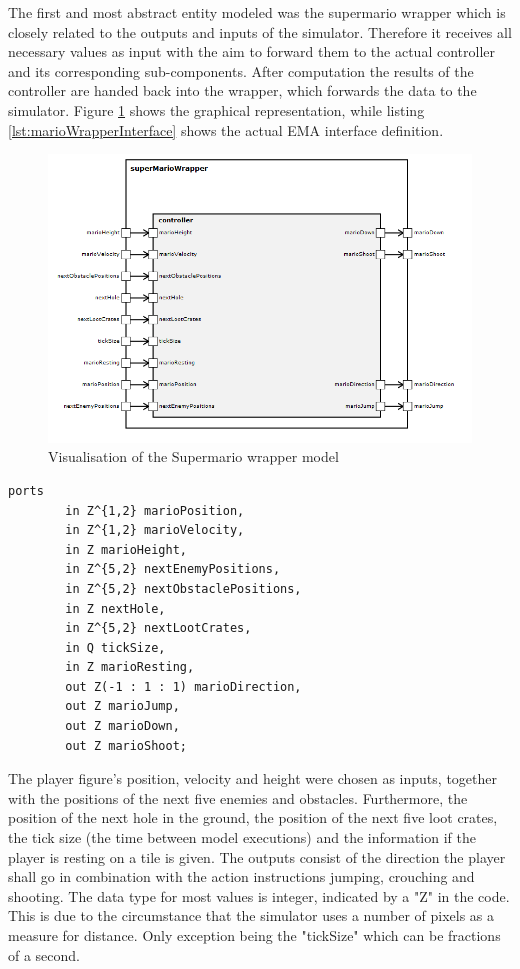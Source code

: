 The first and most abstract entity modeled was the supermario wrapper which is closely related to the outputs and inputs of the simulator. Therefore it receives all necessary values as input with the aim to forward them to the actual controller and its corresponding sub-components. After computation the results of the controller are handed back into the wrapper, which forwards the data to the simulator. Figure \ref{fig:marioWrapper} shows the graphical representation, while listing \ref{lst:marioWrapperInterface} shows the actual EMA interface definition.
\begin{figure}
	\centering
	\includegraphics[scale=0.5]{pictures/haller_supermariowrapper.PNG}
	\caption{Visualisation of the Supermario wrapper model}
	\label{fig:marioWrapper}
\end{figure}

\begin{lstlisting}[label=lst:marioWrapperInterface, caption=Interface of the Supermario Wrapper, morekeywords={ports, port, connect, in, out, instance, ->},
frame=single]
    ports   
        in Z^{1,2} marioPosition,
        in Z^{1,2} marioVelocity,
        in Z marioHeight,
        in Z^{5,2} nextEnemyPositions,
        in Z^{5,2} nextObstaclePositions,
        in Z nextHole,
        in Z^{5,2} nextLootCrates,
        in Q tickSize,
        in Z marioResting,
        out Z(-1 : 1 : 1) marioDirection,
        out Z marioJump,
        out Z marioDown,
        out Z marioShoot;
\end{lstlisting}

The player figure's position, velocity and height were chosen as inputs, together with the positions of the next five enemies and obstacles. Furthermore, the position of the next hole in the ground, the position of the next five loot crates, the tick size (the time between model executions) and the information if the player is resting on a tile is given.
The outputs consist of the direction the player shall go in combination with the action instructions jumping, crouching and shooting.
The data type for most values is integer, indicated by a "Z" in the code. This is due to the circumstance that the simulator uses a number of pixels as a measure for distance. Only exception being the "tickSize" which can be fractions of a second.

